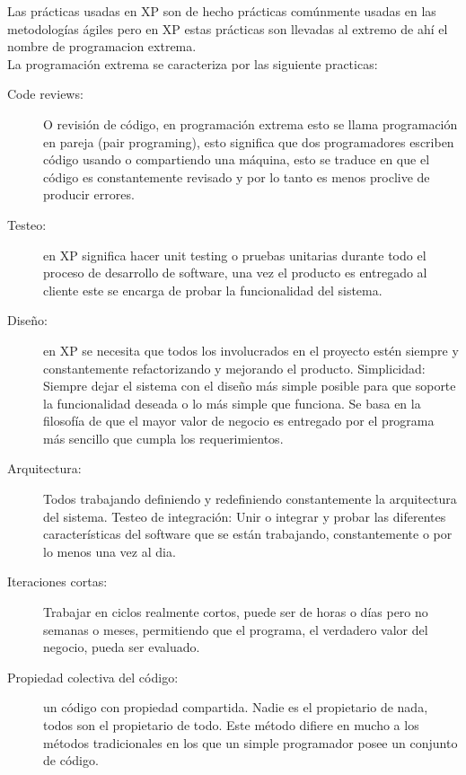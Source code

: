       Las prácticas usadas en XP son de hecho prácticas comúnmente usadas en las metodologías ágiles pero en XP estas prácticas son llevadas al extremo de ahí el nombre de programacion extrema.\\

      La programación extrema se caracteriza por las siguiente practicas:

      \begin{description}
        \item[Code reviews:] O revisión de código, en programación extrema esto se llama programación en pareja (pair programing), esto significa que dos programadores escriben código usando o compartiendo una máquina, esto se traduce en que el código es constantemente revisado y por lo tanto es menos proclive de producir errores.

        \item[Testeo:] en XP significa hacer unit testing o pruebas unitarias durante todo el proceso de desarrollo de software, una vez el producto es entregado al cliente este se encarga de probar la funcionalidad del sistema.

        \item[Diseño:] en XP se necesita que todos los involucrados en el proyecto estén siempre y constantemente refactorizando y mejorando el producto.
        Simplicidad: Siempre dejar el sistema con el diseño más simple posible para que soporte la funcionalidad deseada o lo más simple que funciona. Se basa en la filosofía de que el mayor valor de negocio es entregado por el programa más sencillo que cumpla los requerimientos.

        \item[Arquitectura:] Todos trabajando definiendo y redefiniendo constantemente la arquitectura del sistema.
        Testeo de integración: Unir o integrar y probar las diferentes características del software que se están trabajando, constantemente o por lo menos una vez al dia.

        \item[Iteraciones cortas:]
        Trabajar en ciclos realmente cortos, puede ser de horas o días pero no semanas o meses, permitiendo que el programa, el verdadero valor del negocio, pueda ser evaluado.

        \item[Propiedad colectiva del código:]
        un código con propiedad compartida. Nadie es el propietario de nada, todos son el propietario de todo. Este método difiere en mucho a los métodos tradicionales en los que un simple programador posee un conjunto de código.



\end{description}
